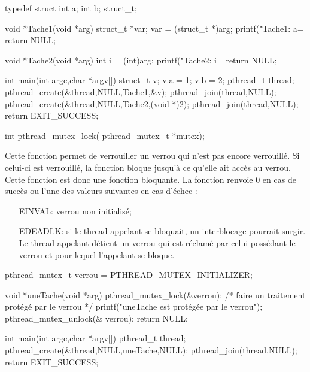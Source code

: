 \begin{codeblock}
typedef struct {
  int a;
  int b;
} struct_t;

void *Tache1(void *arg) {
  struct_t *var;
  var = (struct_t *)arg;
  printf("Tache1: a=%
  return NULL;
}

void *Tache2(void *arg) {
  int i = (int)arg;
  printf("Tache2: i=%
  return NULL;
}

int main(int argc,char *argv[])
{
  struct_t v;
  v.a = 1; v.b = 2;
  pthread_t thread;
  pthread_create(&thread,NULL,Tache1,&v);
  pthread_join(thread,NULL);
  pthread_create(&thread,NULL,Tache2,(void *)2);
  pthread_join(thread,NULL);
  return EXIT_SUCCESS;
}
\end{codeblock}




\label{func:pthread_mutex_lock}

\begin{codeblock}
int pthread_mutex_lock(
    pthread_mutex_t *mutex);
\end{codeblock}

Cette fonction permet de verrouiller un verrou qui n'est pas encore verrouillé. Si celui-ci est verrouillé, la fonction bloque jusqu'à ce qu'elle ait accès au verrou. Cette fonction est donc une fonction bloquante. La fonction renvoie 0 en cas de succès ou l'une des valeurs suivantes en cas d'échec :
\begin{itemize}
\item[EINVAL:] verrou non initialisé;
\item[EDEADLK:] si le thread appelant se bloquait, un interblocage pourrait surgir. Le thread appelant détient un verrou qui est réclamé par celui possédant le verrou et pour lequel l'appelant se bloque.
\end{itemize}

\begin{codeblock}
pthread_mutex_t verrou = PTHREAD_MUTEX_INITIALIZER;

void *uneTache(void *arg) {
  pthread_mutex_lock(&verrou);
  /* faire un traitement protégé par le verrou */
  printf("uneTache est protégée par le verrou\n");
  pthread_mutex_unlock(& verrou);
  return NULL;
}

int main(int argc,char *argv[])
{
  pthread_t thread;
  pthread_create(&thread,NULL,uneTache,NULL);
  pthread_join(thread,NULL);
  return EXIT_SUCCESS;
}
\end{codeblock}




